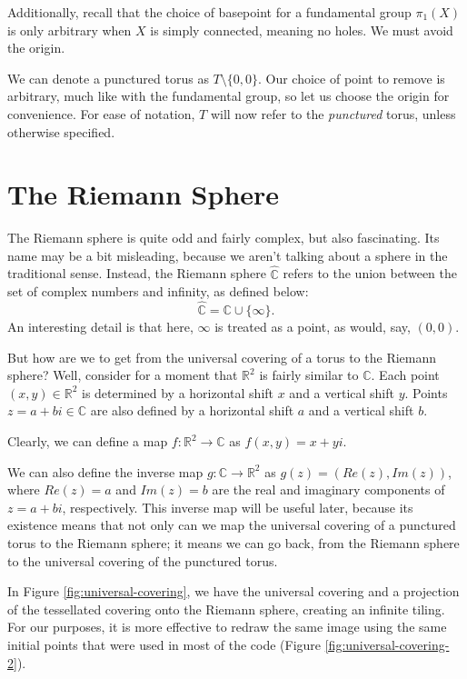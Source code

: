 \documentclass[12pt,a4paper,reqno,parskip=full]{amsart}
\numberwithin{equation}{section}
\theoremstyle{plain}
\theoremstyle{definition}
\def\R{{\mathbb R}}
\def\C{{\mathbb C}}
\begin{document}
Additionally, recall that the choice of basepoint for a fundamental group $\pi_1(X)$ is only arbitrary when $X$ is simply connected, meaning no holes. We must avoid the origin.

We can denote a punctured torus as $T\setminus\{0,0\}$. Our choice of point to remove is arbitrary, much like with the fundamental group, so let us choose the origin for convenience. For ease of notation, $T$ will now refer to the \textit{punctured} torus, unless otherwise specified.

\section{The Riemann Sphere}


The Riemann sphere is quite odd and fairly complex, but also fascinating. Its name may be a bit misleading, because we aren't talking about a sphere in the traditional sense. Instead, the Riemann sphere $\hat\C$ refers to the union between the set of complex numbers and infinity, as defined below:
\[\hat\C=\C\cup\{\infty\}.\]
An interesting detail is that here, $\infty$ is treated as a point, as would, say, $(0,0)$. 

But how are we to get from the universal covering of a torus to the Riemann sphere? Well, consider for a moment that $\R^2$ is fairly similar to $\C$. Each point $(x,y)\in\R^2$ is determined by a horizontal shift $x$ and a vertical shift $y$. Points $z=a+bi\in\C$ are also defined by a horizontal shift $a$ and a vertical shift $b$. 

Clearly, we can define a map $f:\R^2\to\C$ as $f(x,y)=x+yi$.

We can also define the inverse map $g:\C\to\R^2$ as $g(z)=(Re(z),Im(z))$, where $Re(z)=a$ and $Im(z)=b$ are the real and imaginary components of $z=a+bi$, respectively. This inverse map will be useful later, because its existence means that not only can we map the universal covering of a punctured torus to the Riemann sphere; it means we can go back, from the Riemann sphere to the universal covering of the punctured torus.

In Figure \ref{fig:universal-covering}, we have the universal covering and a projection of the tessellated covering onto the Riemann sphere, creating an infinite tiling. For our purposes, it is more effective to redraw the same image using the same initial points that were used in most of the code (Figure \ref{fig:universal-covering-2}). 
\end{document}
